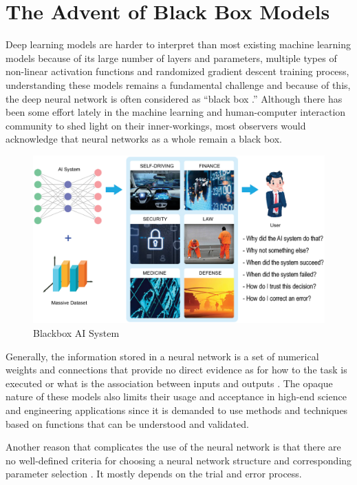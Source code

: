 \section{The Advent of Black Box Models}

Deep learning models are harder to interpret than most existing machine learning models \cite{Kahng2018} because of its large number of layers and parameters, multiple types of non-linear activation functions and randomized gradient descent training process, understanding these models remains a fundamental challenge and because of this, the deep neural network is often considered as “black box \cite{dlvwz}.” Although there has been some effort lately in the machine learning and human-computer interaction community to shed light on their inner-workings, most observers would acknowledge that neural networks as a whole remain a black box.

\begin{figure}[htbp]
\centering
\includegraphics[width=1\textwidth]{images/Blackbox-AI-copy.eps}
\caption{Blackbox AI System}
\label{fig:Blackbox AI system}
\end{figure}

Generally, the information stored in a neural network is a set of numerical weights and connections that provide no direct evidence as for how to the task is executed or what is the association between inputs and outputs \cite{Tzeng2005}. The opaque nature of these models also limits their usage and acceptance in high-end science and engineering applications since it is demanded to use methods and techniques based on functions that can be understood and validated.

Another reason that complicates the use of the neural network is that there are no well-defined criteria for choosing a neural network structure and corresponding parameter selection \cite{dlvwz}. It mostly depends on the trial and error process.

